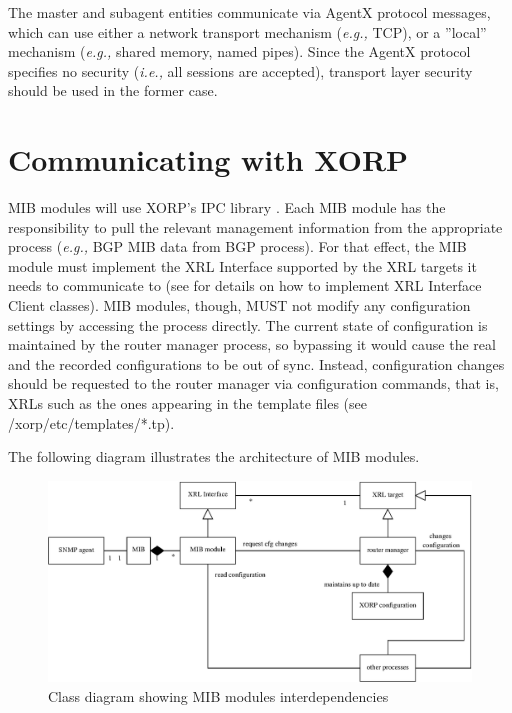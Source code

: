 \documentclass[11pt]{article}
\newcommand{\ie}{\emph{i.e.,}\xspace}
\newcommand{\eg}{\emph{e.g.,}\xspace}
\begin{document}
The master and subagent entities communicate via AgentX protocol messages, which
can use either a network transport mechanism (\eg TCP), or a ''local'' mechanism
(\eg shared memory, named pipes).  Since the AgentX protocol specifies no
security (\ie all sessions are accepted), transport layer security should be
used in the former case.


\section{Communicating with XORP}

MIB modules will use XORP's IPC library \cite{xorp:xrl}.  Each MIB module has the
responsibility to pull the relevant management information from the appropriate
process (\eg BGP MIB data from BGP process).  For that effect, the MIB module
must implement the XRL Interface supported by the XRL targets it needs to
communicate to (see \cite{xorp:xrl_interfaces} for details on how to implement
XRL Interface Client classes).  MIB modules, though, MUST not modify any
configuration settings by accessing the process directly.  The current state of
configuration is maintained by the router manager process, so bypassing it would
cause the real and the recorded configurations to be out of sync.  Instead,
configuration changes should be requested to the router manager via
configuration commands, that is, XRLs such as the ones appearing in the template
files (see /xorp/etc/templates/*.tp).

The following diagram illustrates the architecture of MIB modules.
\begin{figure}
  \begin{center}
    \includegraphics[width=1\textwidth]{figs/snmp_fig1}
  \end{center}
  \caption{Class diagram showing MIB modules interdependencies}
  \label{fig:mib-class-diag}
\end{figure}
\end{document}
